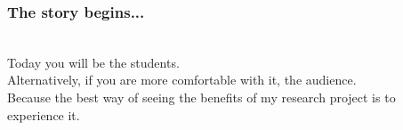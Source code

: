 \begin{frame}
  \frametitle{The story begins... }
  \begin{module}[id=storyBegin]
    \\
    Today you will be the students.\\
    \vspace{3mm}
    Alternatively, if you are more comfortable with it, the audience.\\
    \vspace{3mm}
    Because the best way of seeing the benefits of my research project is to experience it.\\
    \vspace{1cm}
  \end{module}
\end{frame}

